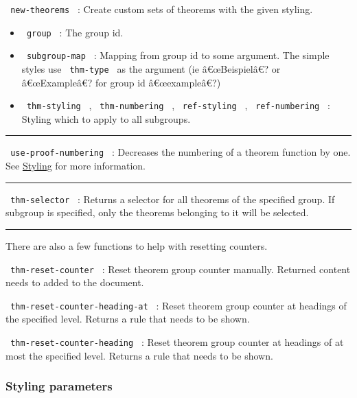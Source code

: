 \texttt{\ new-theorems\ } : Create custom sets of theorems with the
given styling.

\begin{itemize}
\tightlist
\item
  \texttt{\ group\ } : The group id.
\item
  \texttt{\ subgroup-map\ } : Mapping from group id to some argument.
  The simple styles use \texttt{\ thm-type\ } as the argument (ie
  â€œBeispielâ€? or â€œExampleâ€? for group id â€œexampleâ€?)
\item
  \texttt{\ thm-styling\ } , \texttt{\ thm-numbering\ } ,
  \texttt{\ ref-styling\ } , \texttt{\ ref-numbering\ } : Styling which
  to apply to all subgroups.
\end{itemize}

\begin{center}\rule{0.5\linewidth}{0.5pt}\end{center}

\texttt{\ use-proof-numbering\ } : Decreases the numbering of a theorem
function by one. See
\href{https://github.com/typst/packages/raw/main/packages/preview/lemmify/0.1.6/\#styling}{Styling}
for more information.

\begin{center}\rule{0.5\linewidth}{0.5pt}\end{center}

\texttt{\ thm-selector\ } : Returns a selector for all theorems of the
specified group. If subgroup is specified, only the theorems belonging
to it will be selected.

\begin{center}\rule{0.5\linewidth}{0.5pt}\end{center}

There are also a few functions to help with resetting counters.

\texttt{\ thm-reset-counter\ } : Reset theorem group counter manually.
Returned content needs to added to the document.

\texttt{\ thm-reset-counter-heading-at\ } : Reset theorem group counter
at headings of the specified level. Returns a rule that needs to be
shown.

\texttt{\ thm-reset-counter-heading\ } : Reset theorem group counter at
headings of at most the specified level. Returns a rule that needs to be
shown.

\subsubsection{Styling parameters}\label{styling-parameters}

